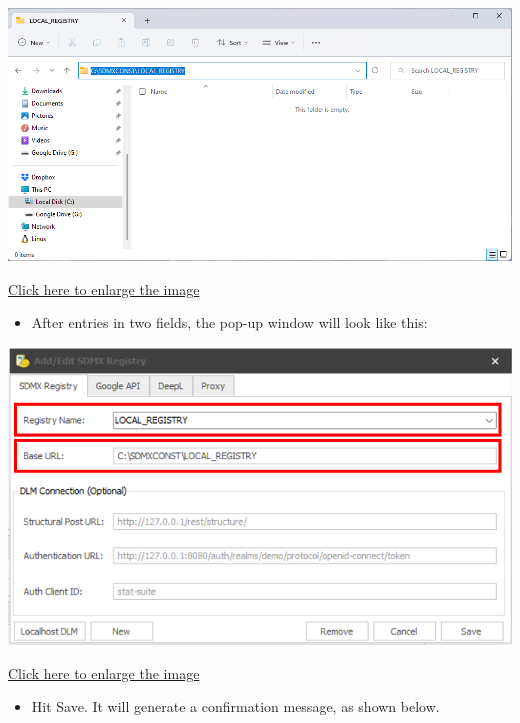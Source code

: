 \documentclass[
]{book}
\providecommand{\tightlist}{%
  \setlength{\itemsep}{0pt}\setlength{\parskip}{0pt}}
\begin{document}
\begin{center}\includegraphics[width=1\linewidth]{./images/image052} \end{center}

\href{images/image052.png}{Click here to enlarge the image}

\begin{itemize}
\tightlist
\item
  After entries in two fields, the pop-up window will look like this:
\end{itemize}

\begin{center}\includegraphics[width=1\linewidth]{./images/image054} \end{center}

\href{images/image054.png}{Click here to enlarge the image}

\begin{itemize}
\tightlist
\item
  Hit Save. It will generate a confirmation message, as shown below.
\end{itemize}
\end{document}
